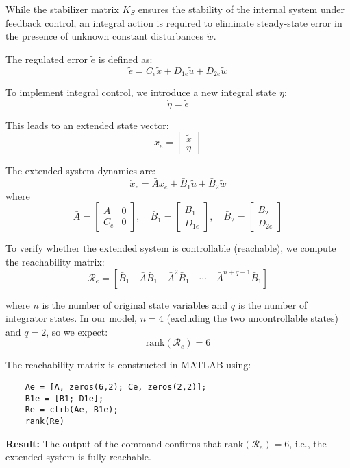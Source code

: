 \documentclass[]{report}
\begin{document}
While the stabilizer matrix $K_S$ ensures the stability of the internal system under feedback control, an integral action is required to eliminate steady-state error in the presence of unknown constant disturbances $\tilde{w}$.

The regulated error $\tilde{e}$ is defined as:
\[
\tilde{e} = C_e \tilde{x} + D_{1e} \tilde{u} + D_{2e} \tilde{w}
\]

To implement integral control, we introduce a new integral state $\eta$:
\[
\dot{\eta} = \tilde{e}
\]

This leads to an extended state vector:
\[
x_e = \begin{bmatrix} \tilde{x} \\ \eta \end{bmatrix}
\]

The extended system dynamics are:
\[
\dot{x}_e = \bar{A} x_e + \bar{B}_1 \tilde{u} + \bar{B}_2 \tilde{w}
\]
where
\[
\bar{A} = \begin{bmatrix}
	A & 0 \\
	C_e & 0
\end{bmatrix},
\quad
\bar{B}_1 = \begin{bmatrix}
	B_1 \\
	D_{1e}
\end{bmatrix},
\quad
\bar{B}_2 = \begin{bmatrix}
	B_2 \\
	D_{2e}
\end{bmatrix}
\]

To verify whether the extended system is controllable (reachable), we compute the reachability matrix:
\[
\mathcal{R}_e = \left[\bar{B}_1 \quad \bar{A}\bar{B}_1 \quad \bar{A}^2\bar{B}_1 \quad \cdots \quad \bar{A}^{n+q-1} \bar{B}_1 \right]
\]

where $n$ is the number of original state variables and $q$ is the number of integrator states. In our model, $n=4$ (excluding the two uncontrollable states) and $q=2$, so we expect:
\[
\text{rank}(\mathcal{R}_e) = 6
\]

The reachability matrix is constructed in MATLAB using:

\begin{verbatim}
	Ae = [A, zeros(6,2); Ce, zeros(2,2)];
	B1e = [B1; D1e];
	Re = ctrb(Ae, B1e);
	rank(Re)
\end{verbatim}

\textbf{Result:}  
The output of the command confirms that $\text{rank}(\mathcal{R}_e) = 6$, i.e., the extended system is fully reachable.
\end{document}
